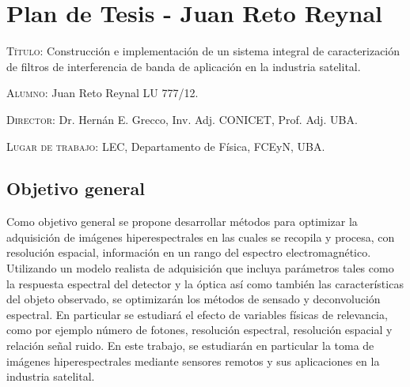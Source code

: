 \documentclass{ctuthesis}
\begin{document}
\maketitle
\renewcommand{\chaptername}{Capítulo}
\chapter*{Plan de Tesis - Juan Reto Reynal}


\textsc{Título:} Construcción e implementación de un sistema integral de caracterización de filtros de interferencia de banda de aplicación en la industria satelital.


\hspace{-0.4cm}\textsc{Alumno:} Juan Reto Reynal LU 777/12.

\hspace{-0.4cm}\textsc{Director:} Dr. Hernán E. Grecco, Inv. Adj. CONICET, Prof. Adj. UBA.

\hspace{-0.4cm}\textsc{Lugar de trabajo:} LEC, Departamento de Física, FCEyN, UBA.


\section*{Objetivo general}
Como objetivo general se propone desarrollar métodos para optimizar la
adquisición de imágenes hiperespectrales en las cuales se recopila y procesa, con
resolución espacial, información en un rango del espectro electromagnético. Utilizando
un modelo realista de adquisición que incluya parámetros tales como la respuesta
espectral del detector y la óptica así como también las características del objeto
observado, se optimizarán los métodos de sensado y deconvolución espectral. En
particular se estudiará el efecto de variables físicas de relevancia, como por ejemplo
número de fotones, resolución espectral, resolución espacial y relación señal ruido. En
este trabajo, se estudiarán en particular la toma de imágenes hiperespectrales
mediante sensores remotos y sus aplicaciones en la industria satelital.
\end{document}
